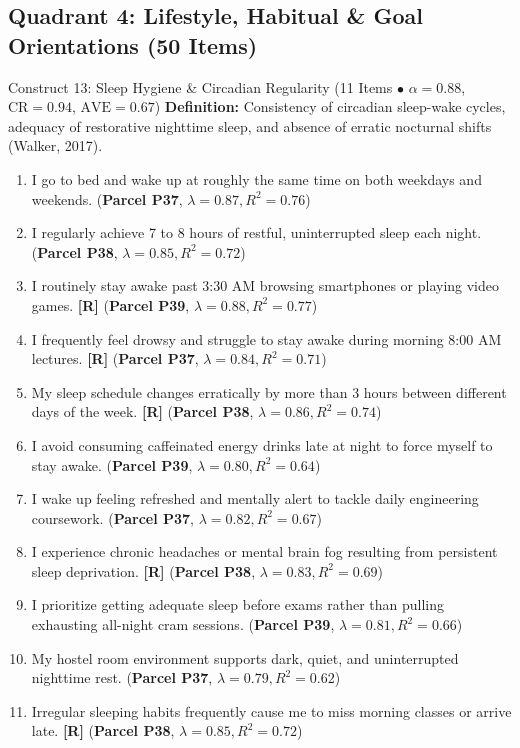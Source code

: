 \documentclass[10pt,a4paper]{article}
\begin{document}
\subsection{Quadrant 4: Lifestyle, Habitual \& Goal Orientations (50 Items)}

\begin{constructbox}{Construct 13: Sleep Hygiene \& Circadian Regularity (11 Items $\bullet$ $\alpha = 0.88$, $\text{CR} = 0.94$, $\text{AVE} = 0.67$)}
\textbf{Definition:} Consistency of circadian sleep-wake cycles, adequacy of restorative nighttime sleep, and absence of erratic nocturnal shifts (Walker, 2017).
\begin{enumerate}[label=\textbf{Q\arabic*.}, leftmargin=2.5em, itemsep=2pt, resume]
  \item I go to bed and wake up at roughly the same time on both weekdays and weekends. \hfill (\textbf{Parcel P37}, $\lambda = 0.87, R^2 = 0.76$)
  \item I regularly achieve 7 to 8 hours of restful, uninterrupted sleep each night. \hfill (\textbf{Parcel P38}, $\lambda = 0.85, R^2 = 0.72$)
  \item I routinely stay awake past 3:30 AM browsing smartphones or playing video games. \textbf{[R]} \hfill (\textbf{Parcel P39}, $\lambda = 0.88, R^2 = 0.77$)
  \item I frequently feel drowsy and struggle to stay awake during morning 8:00 AM lectures. \textbf{[R]} \hfill (\textbf{Parcel P37}, $\lambda = 0.84, R^2 = 0.71$)
  \item My sleep schedule changes erratically by more than 3 hours between different days of the week. \textbf{[R]} \hfill (\textbf{Parcel P38}, $\lambda = 0.86, R^2 = 0.74$)
  \item I avoid consuming caffeinated energy drinks late at night to force myself to stay awake. \hfill (\textbf{Parcel P39}, $\lambda = 0.80, R^2 = 0.64$)
  \item I wake up feeling refreshed and mentally alert to tackle daily engineering coursework. \hfill (\textbf{Parcel P37}, $\lambda = 0.82, R^2 = 0.67$)
  \item I experience chronic headaches or mental brain fog resulting from persistent sleep deprivation. \textbf{[R]} \hfill (\textbf{Parcel P38}, $\lambda = 0.83, R^2 = 0.69$)
  \item I prioritize getting adequate sleep before exams rather than pulling exhausting all-night cram sessions. \hfill (\textbf{Parcel P39}, $\lambda = 0.81, R^2 = 0.66$)
  \item My hostel room environment supports dark, quiet, and uninterrupted nighttime rest. \hfill (\textbf{Parcel P37}, $\lambda = 0.79, R^2 = 0.62$)
  \item Irregular sleeping habits frequently cause me to miss morning classes or arrive late. \textbf{[R]} \hfill (\textbf{Parcel P38}, $\lambda = 0.85, R^2 = 0.72$)
\end{enumerate}
\end{constructbox}
\end{document}
